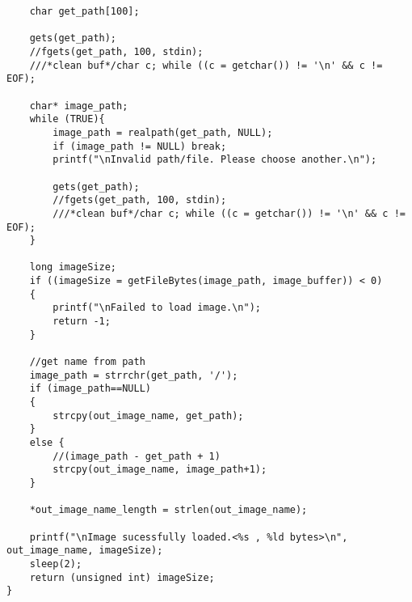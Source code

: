 \begin{lstlisting}
	char get_path[100];

	gets(get_path);
	//fgets(get_path, 100, stdin);
	///*clean buf*/char c; while ((c = getchar()) != '\n' && c != EOF);

	char* image_path;
	while (TRUE){
		image_path = realpath(get_path, NULL);
		if (image_path != NULL) break;
		printf("\nInvalid path/file. Please choose another.\n");

		gets(get_path);
		//fgets(get_path, 100, stdin); 
		///*clean buf*/char c; while ((c = getchar()) != '\n' && c != EOF);
	}

	long imageSize;
	if ((imageSize = getFileBytes(image_path, image_buffer)) < 0)
	{
		printf("\nFailed to load image.\n");
		return -1;
	}

	//get name from path
	image_path = strrchr(get_path, '/');
	if (image_path==NULL)
	{
		strcpy(out_image_name, get_path);
	}
	else {
		//(image_path - get_path + 1)
		strcpy(out_image_name, image_path+1);
	}

	*out_image_name_length = strlen(out_image_name);

	printf("\nImage sucessfully loaded.<%s , %ld bytes>\n", out_image_name, imageSize);
	sleep(2);
	return (unsigned int) imageSize;
}
\end{lstlisting}